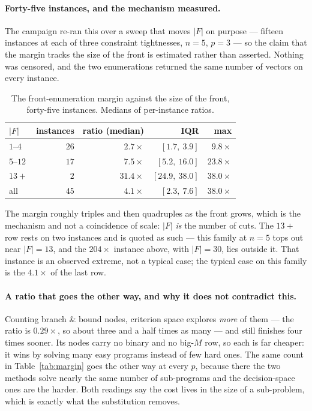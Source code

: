 \documentclass[11pt,a4paper]{article}
\begin{document}
\paragraph{Forty-five instances, and the mechanism measured.}  The campaign
re-ran this over a sweep that moves $|F|$ on purpose --- fifteen instances at
each of three constraint tightnesses, $n=5$, $p=3$ --- so the claim that the
margin tracks the size of the front is estimated rather than asserted.  Nothing
was censored, and the two enumerations returned the same number of vectors on
every instance.

\begin{table}[h]
\centering
\caption{The front-enumeration margin against the size of the front, forty-five
instances.  Medians of per-instance ratios.}
\label{tab:frontsize}
\begin{tabular}{lrrrr}
\toprule
$|F|$ & instances & ratio (median) & IQR & max \\
\midrule
$1$--$4$  & $26$ & $2.7\times$  & $[1.7,\ 3.9]$   & $9.8\times$ \\
$5$--$12$ & $17$ & $7.5\times$  & $[5.2,\ 16.0]$  & $23.8\times$ \\
$13+$     & $2$  & $31.4\times$ & $[24.9,\ 38.0]$ & $38.0\times$ \\
\midrule
all       & $45$ & $4.1\times$  & $[2.3,\ 7.6]$   & $38.0\times$ \\
\bottomrule
\end{tabular}
\end{table}

\noindent
The margin roughly triples and then quadruples as the front grows, which is the
mechanism and not a coincidence of scale: $|F|$ \emph{is} the number of cuts.
The $13+$ row rests on two instances and is quoted as such --- this family at
$n=5$ tops out near $|F| = 13$, and the $204\times$ instance above, with
$|F| = 30$, lies outside it.  That instance is an observed extreme, not a
typical case; the typical case on this family is the $4.1\times$ of the last
row.

\paragraph{A ratio that goes the other way, and why it does not contradict
this.}  Counting branch \& bound nodes, criterion space explores \emph{more} of
them --- the ratio is $0.29\times$, so about three and a half times as many ---
and still finishes four times sooner.  Its nodes carry no binary and no
big-$M$ row, so each is far cheaper: it wins by solving many easy programs
instead of few hard ones.  The same count in Table~\ref{tab:margin} goes the
other way at every $p$, because there the two methods solve nearly the same
number of sub-programs and the decision-space ones are the harder.  Both
readings say the cost lives in the size of a sub-problem, which is exactly what
the substitution removes.
\end{document}
